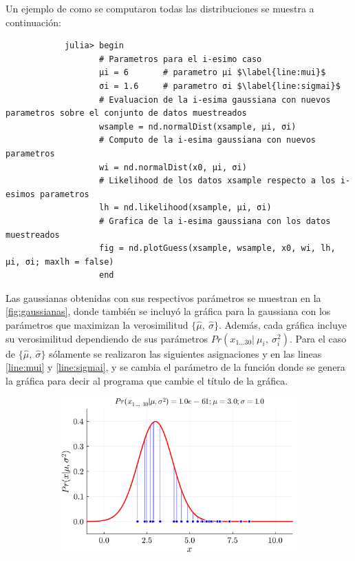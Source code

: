 \begin{enumerate}
    \begin{solution}
        Un ejemplo de como se computaron todas las distribuciones se muestra a continuación:
        \begin{verbatim}
            julia> begin
                   # Parametros para el i-esimo caso
                   μi = 6       # parametro μi $\label{line:mui}$
                   σi = 1.6     # parametro σi $\label{line:sigmai}$
                   # Evaluacion de la i-esima gaussiana con nuevos parametros sobre el conjunto de datos muestreados
                   wsample = nd.normalDist(xsample, μi, σi)
                   # Computo de la i-esima gaussiana con nuevos parametros
                   wi = nd.normalDist(x0, μi, σi)
                   # Likelihood de los datos xsample respecto a los i-esimos parametros
                   lh = nd.likelihood(xsample, μi, σi)
                   # Grafica de la i-esima gaussiana con los datos muestreados
                   fig = nd.plotGuess(xsample, wsample, x0, wi, lh, μi, σi; maxlh = false)
                   end
        \end{verbatim}
        Las gaussianas obtenidas con sus respectivos parámetros se muestran en la \cref{fig:gaussianas}, donde también se incluyó la gráfica para la gaussiana con los parámetros que maximizan la verosimilitud $\{\hat{\mu},\ \hat{\sigma}\}$. Además, cada gráfica incluye su verosimilitud dependiendo de sus parámetros $Pr(x_{1 \ldots 30} |\ \mu_i,\ \sigma_{i}^2)$. Para el caso de $\{\hat{\mu},\ \hat{\sigma}\}$ sólamente se realizaron las siguientes asignaciones  y  en las lineas \ref{line:mui} y \ref{line:sigmai}, y se cambia el parámetro  de la función donde se genera la gráfica para decir al programa que cambie el título de la gráfica.
        \begin{figure}[H]
            \centering
            \begin{subfigure}{\textwidth}
                \centering
                \includegraphics[scale=0.4]{../figures/dist_1.pdf}

\end{subfigure}
\end{figure}
\end{solution}
\end{enumerate}
